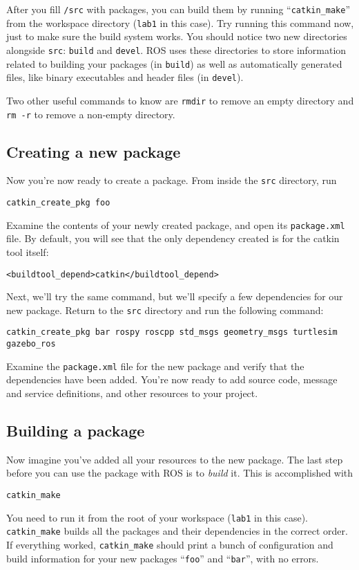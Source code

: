 \documentclass{article}
\begin{document}
After you fill \verb=/src= with packages, you can build them by running ``\verb=catkin_make='' from the workspace directory (\verb=lab1= in this case). Try running this command now, just to make sure the build system works. You should notice two new directories alongside \verb=src=: \verb=build= and \verb=devel=. ROS uses these directories to store information related to building your packages (in \verb=build=) as well as automatically generated files, like binary executables and header files (in \verb=devel=).

Two other useful commands to know are \verb=rmdir= to remove an empty directory and \verb=rm -r= to remove a non-empty directory.

\subsection{Creating a new package}
Now you're now ready to create a package. From inside the \verb=src=  directory, run
\begin{Verbatim}[frame=single]
catkin_create_pkg foo
\end{Verbatim}
Examine the contents of your newly created package, and open its \verb=package.xml= file. By default, you will see that the only dependency created is for the catkin tool itself:
\begin{Verbatim}[frame=single]
<buildtool_depend>catkin</buildtool_depend>
\end{Verbatim}

Next, we'll try the same command, but we'll specify a few dependencies for our new package. Return to the \verb=src= directory and run the following command:
\begin{Verbatim}[frame=single]
catkin_create_pkg bar rospy roscpp std_msgs geometry_msgs turtlesim gazebo_ros
\end{Verbatim}
Examine the \verb=package.xml= file for the new package and verify that the dependencies have been added. You're now ready to add source code, message and service definitions, and other resources to your project.

\subsection{Building a package}
Now imagine you've added all your resources to the new package. The last step before you can use the package with ROS is to \emph{build} it. This is accomplished with
\begin{Verbatim}[frame=single]
catkin_make
\end{Verbatim} 
You need to run it from the root of your workspace (\verb=lab1= in this case). \\
\verb=catkin_make= builds all the packages and their dependencies in the correct order. If everything worked, \verb=catkin_make= should print a bunch of configuration and build information for your new packages ``\verb=foo='' and ``\verb=bar='', with no errors.\\
\end{document}
